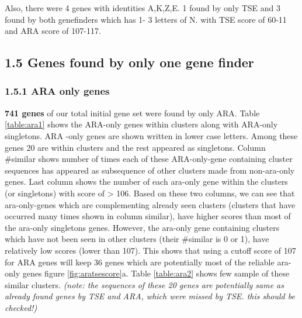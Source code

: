 \documentclass[table,
12pt, %
a4paper, %
oneside, %
headinclude,footinclude, %
BCOR5mm, %
]{scrartcl}
\begin{document}
Also, there were 4 genes with identities A,K,Z,E. 1 found by only TSE and 3 found by both genefinders which has 1- 3 letters of N. with TSE score of 60-11 and ARA score of 107-117.



\subsection{\textbf{1.5 Genes found by only one gene finder}}
\subsubsection{1.5.1 ARA only genes}
\textbf{741 genes} of our total initial gene set were found by only ARA. Table \ref{table:ara1} shows the ARA-only genes within clusters along with ARA-only  singletons. ARA -only genes are shown written in lower case letters. Among these genes 20 are within clusters and the rest appeared as singletons. Column \#similar shows number of times each of these ARA-only-gene containing cluster sequences has appeared as subsequence of other clusters made from non-ara-only genes. Last column shows the number of each ara-only gene within the clusters (or singletons) with score of > 106. Based on these two columns, we can see that ara-only-genes which are complementing already seen clusters (clusters that have occurred many times shown in column similar), have higher scores than most of the ara-only singletons genes. However, the ara-only gene containing clusters which have not been seen in other clusters (their \#similar is 0 or 1), have relatively low scores (lower than 107). This shows that using a cutoff score of 107 for ARA genes will keep 36 genes which are potentially most of the reliable ara-only genes figure \ref{fig:aratsescore}a. Table \ref{table:ara2} shows few sample of these similar clusters.
\emph{(note: the sequences of these 20 genes are potentially same as already found genes by TSE and ARA, which were missed by TSE. this should be checked!)  }
\end{document}
